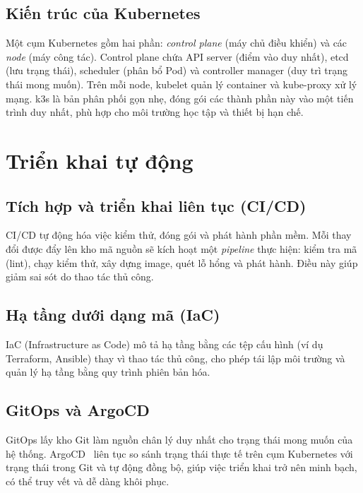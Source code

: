 \subsection{Kiến trúc của Kubernetes}
\label{subsec:k8sarch}

Một cụm Kubernetes gồm hai phần: \textit{control plane} (máy chủ điều khiển) và
các \textit{node} (máy công tác). Control plane chứa API server (điểm vào duy
nhất), etcd (lưu trạng thái), scheduler (phân bổ Pod) và controller manager
(duy trì trạng thái mong muốn). Trên mỗi node, kubelet quản lý container và
kube-proxy xử lý mạng. k3s là bản phân phối gọn nhẹ, đóng gói các thành phần
này vào một tiến trình duy nhất, phù hợp cho môi trường học tập và thiết bị hạn
chế.

\section{Triển khai tự động}
\label{sec:autodeploy}

\subsection{Tích hợp và triển khai liên tục (CI/CD)}

CI/CD tự động hóa việc kiểm thử, đóng gói và phát hành phần mềm. Mỗi thay đổi
được đẩy lên kho mã nguồn sẽ kích hoạt một \textit{pipeline} thực hiện: kiểm tra
mã (lint), chạy kiểm thử, xây dựng image, quét lỗ hổng và phát hành. Điều này
giúp giảm sai sót do thao tác thủ công.

\subsection{Hạ tầng dưới dạng mã (IaC)}

IaC (Infrastructure as Code) mô tả hạ tầng bằng các tệp cấu hình (ví dụ
Terraform, Ansible) thay vì thao tác thủ công, cho phép tái lập môi trường và
quản lý hạ tầng bằng quy trình phiên bản hóa.

\subsection{GitOps và ArgoCD}

GitOps lấy kho Git làm nguồn chân lý duy nhất cho trạng thái mong muốn
của hệ thống. ArgoCD~\cite{argocd} liên tục so sánh trạng thái thực tế trên
cụm Kubernetes với trạng thái trong Git và tự động đồng bộ, giúp việc triển
khai trở nên minh bạch, có thể truy vết và dễ dàng khôi phục.

